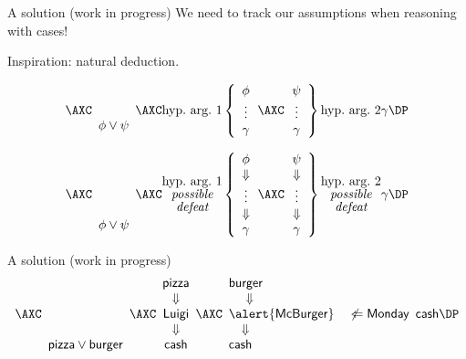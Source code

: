 \documentclass[aspectratio=169]{beamer}
\begin{document}
\begin{frame}[label={sec:org6b86e0c}]{A solution (work in progress)}
We need to track our assumptions when reasoning with cases!

Inspiration: natural deduction.

\vspace{-.5cm}

\[
\axs{\array{c} \phantom{M} \\ \phantom{M} \\ \phi \vee \psi \endarray}
\axs{\mbox{hyp.~arg.~1} \left\{ \array{c} \phi \\ \vdots \\ \gamma \endarray \right.}
\axs{\left. \array{c} \psi \\ \vdots \\ \gamma \endarray \right\} \mbox{hyp.~arg.~2} }
\irl3{RbC}{\gamma}
\DP
\]

\pause

\[
\axs{\array{c} \phantom{M} \\ \phantom{M} \\ \phantom{M} \\ \phantom{M} \\ \phi \vee \psi \endarray}
\axs{\substack{\mbox{hyp.~arg.~1} \\ \mbox{\it possible} \\ \mbox{\it defeat}} \left\{ \array{c} \phi \\ \Downarrow \\ \vdots \\ \Downarrow \\ \gamma \endarray \right.}
\axs{\left. \array{c} \psi \\ \Downarrow \\ \vdots \\ \Downarrow \\ \gamma \endarray \right\} \substack{\mbox{hyp.~arg.~2} \\ \mbox{\it possible} \\ \mbox{\it defeat}} }
\irl3{RbC}{\gamma}
\DP
\]
\end{frame}
\begin{frame}[label={sec:org0c5900f}]{A solution (work in progress)}
\[
\axs{\array{c} \phantom{M} \\ \phantom{M} \\ \phantom{M} \\ \phantom{M} \\ \mathsf{pizza} \vee \mathsf{burger} \endarray}
\axs{\array{c} \mathsf{pizza} \\ \Downarrow \\ \mathsf{Luigi} \\ \Downarrow \\ \mathsf{cash} \endarray}
\axs{\array{l} \mathsf{burger} \\ ~~~~\Downarrow \\ \alert{\mathsf{McBurger}} \quad \not\Leftarrow \mathsf{Monday} \\ ~~~\Downarrow \\ \mathsf{cash} \endarray}
\irl3{RbC}{\mathsf{cash}}
\DP
\]
\end{frame}
\end{document}
